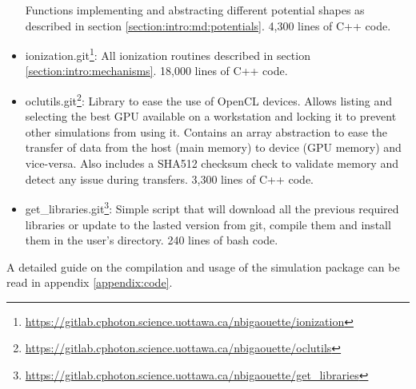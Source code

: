 \begin{itemize}
    Functions implementing and abstracting different potential shapes as
    described in section \ref{section:intro:md:potentials}. 4,300 lines of C++ code.
\item ionization.git\footnote{ \url{
    https://gitlab.cphoton.science.uottawa.ca/nbigaouette/ionization}}:
    All ionization routines described in section
    \ref{section:intro:mechanisms}. 18,000 lines of C++ code.
\item oclutils.git\footnote{ \url{
    https://gitlab.cphoton.science.uottawa.ca/nbigaouette/oclutils}}:
    Library to ease the use of OpenCL devices. Allows listing and selecting the
    best GPU available on a workstation and locking it to prevent
    other simulations from using it. Contains an array abstraction to ease the
    transfer of data from the host (main memory) to device (GPU memory) and
    vice-versa. Also includes a SHA512 checksum check to validate memory
    and detect any issue during transfers. 3,300 lines of C++ code.
\item get\_libraries.git\footnote{ \url{
    https://gitlab.cphoton.science.uottawa.ca/nbigaouette/get_libraries}}:
    Simple script that will download all the previous required libraries or
    update to the lasted version from git, compile them and install them in the
    user's directory. 240 lines of bash code.
\end{itemize}
A detailed guide on the compilation and usage of the simulation package can be
read in appendix \ref{appendix:code}.


